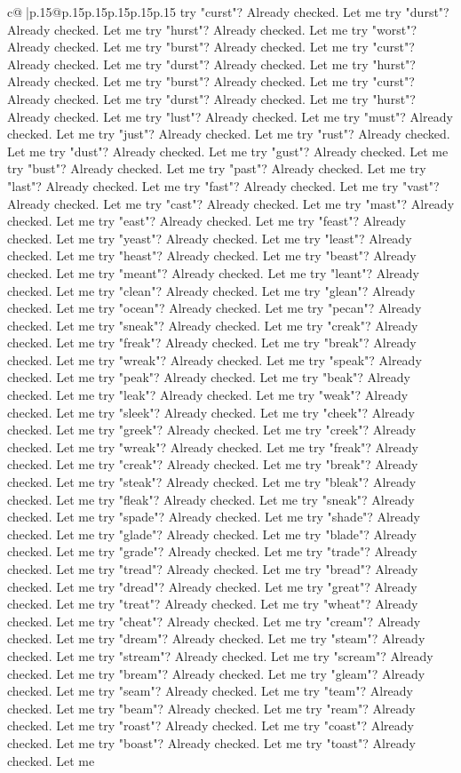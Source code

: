 \documentclass{article}
\begin{document}
{\begin{supertabular}{c@{$\;$}|p{.15\linewidth}@{}p{.15\linewidth}p{.15\linewidth}p{.15\linewidth}p{.15\linewidth}p{.15\linewidth}}
{{{try "curst"? Already checked. Let me try "durst"? Already checked. Let me try "hurst"? Already checked. Let me try "worst"? Already checked. Let me try "burst"? Already checked. Let me try "curst"? Already checked. Let me try "durst"? Already checked. Let me try "hurst"? Already checked. Let me try "burst"? Already checked. Let me try "curst"? Already checked. Let me try "durst"? Already checked. Let me try "hurst"? Already checked. Let me try "lust"? Already checked. Let me try "must"? Already checked. Let me try "just"? Already checked. Let me try "rust"? Already checked. Let me try "dust"? Already checked. Let me try "gust"? Already checked. Let me try "bust"? Already checked. Let me try "past"? Already checked. Let me try "last"? Already checked. Let me try "fast"? Already checked. Let me try "vast"? Already checked. Let me try "cast"? Already checked. Let me try "mast"? Already checked. Let me try "east"? Already checked. Let me try "feast"? Already checked. Let me try "yeast"? Already checked. Let me try "least"? Already checked. Let me try "heast"? Already checked. Let me try "beast"? Already checked. Let me try "meant"? Already checked. Let me try "leant"? Already checked. Let me try "clean"? Already checked. Let me try "glean"? Already checked. Let me try "ocean"? Already checked. Let me try "pecan"? Already checked. Let me try "sneak"? Already checked. Let me try "creak"? Already checked. Let me try "freak"? Already checked. Let me try "break"? Already checked. Let me try "wreak"? Already checked. Let me try "speak"? Already checked. Let me try "peak"? Already checked. Let me try "beak"? Already checked. Let me try "leak"? Already checked. Let me try "weak"? Already checked. Let me try "sleek"? Already checked. Let me try "cheek"? Already checked. Let me try "greek"? Already checked. Let me try "creek"? Already checked. Let me try "wreak"? Already checked. Let me try "freak"? Already checked. Let me try "creak"? Already checked. Let me try "break"? Already checked. Let me try "steak"? Already checked. Let me try "bleak"? Already checked. Let me try "fleak"? Already checked. Let me try "sneak"? Already checked. Let me try "spade"? Already checked. Let me try "shade"? Already checked. Let me try "glade"? Already checked. Let me try "blade"? Already checked. Let me try "grade"? Already checked. Let me try "trade"? Already checked. Let me try "tread"? Already checked. Let me try "bread"? Already checked. Let me try "dread"? Already checked. Let me try "great"? Already checked. Let me try "treat"? Already checked. Let me try "wheat"? Already checked. Let me try "cheat"? Already checked. Let me try "cream"? Already checked. Let me try "dream"? Already checked. Let me try "steam"? Already checked. Let me try "stream"? Already checked. Let me try "scream"? Already checked. Let me try "bream"? Already checked. Let me try "gleam"? Already checked. Let me try "seam"? Already checked. Let me try "team"? Already checked. Let me try "beam"? Already checked. Let me try "ream"? Already checked. Let me try "roast"? Already checked. Let me try "coast"? Already checked. Let me try "boast"? Already checked. Let me try "toast"? Already checked. Let me }}}
\end{supertabular}}
\end{document}
